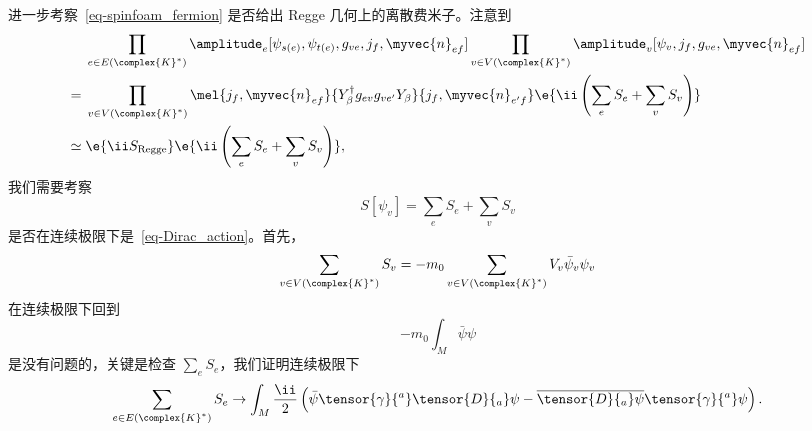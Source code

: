	进一步考察~\eqref{eq-spinfoam_fermion} 是否给出 Regge 几何上的离散费米子。注意到
	\begin{equation}
		\begin{split}
			&\prod_{e\in E(\complex{K}^*)} \amplitude_e[\psi_{s(e)},\psi_{t(e)},g_{ve},j_f,\myvec{n}_{ef}] \prod_{v\in V(\complex{K}^*)} \amplitude_v[\psi_v,j_f,g_{ve},\myvec{n}_{ef}]\\
			={}& \prod_{v\in V(\complex{K}^*)} \mel{j_f,\myvec{n}_{ef}}{Y_\beta^\dagger g_{ev} g_{ve'} Y_\beta}{j_f,\myvec{n}_{e'f}} \e{\ii \left( \sum_e S_e + \sum_v S_v \right)}\\
			\simeq{}& \e{\ii S_{\text{Regge}}} \e{\ii \left( \sum_e S_e + \sum_v S_v \right)},
		\end{split}
	\end{equation}
	我们需要考察
	\begin{equation}
		S[\psi_v] = \sum_{e} S_e + \sum_v S_v
	\end{equation}
	是否在连续极限下是~\eqref{eq-Dirac_action}。首先，
	\begin{equation}
		\sum_{v\in V(\complex{K}^*)} S_v = -m_0 \sum_{v\in V(\complex{K}^*)} V_v \bar{\psi}_v \psi_v
	\end{equation}
	在连续极限下回到
	\begin{equation}
		-m_0 \int_M \bar{\psi}\psi
	\end{equation}
	是没有问题的，关键是检查 $\sum_{e} S_e$，我们证明连续极限下
	\begin{equation}
		\sum_{e \in E(\complex{K}^*)} S_e \rightarrow \int_M \frac{\ii}{2} \left( \bar{\psi} \tensor{\gamma}{^a} \tensor{D}{_a} \psi - \overline{\tensor{D}{_a} \psi} \tensor{\gamma}{^a} \psi \right).
	\end{equation}
